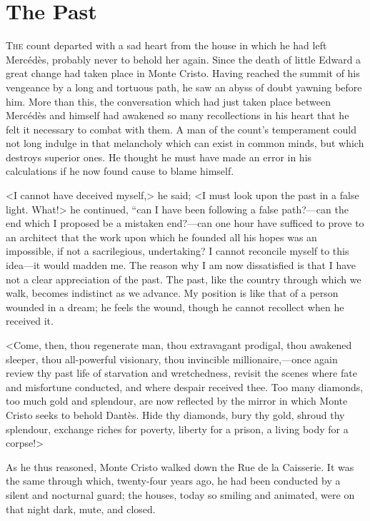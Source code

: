 \chapter{The Past} 

 \lettrine{T}{he} count departed with a sad heart from the house in which he had left Mercédès, probably never to behold her again. Since the death of little Edward a great change had taken place in Monte Cristo. Having reached the summit of his vengeance by a long and tortuous path, he saw an abyss of doubt yawning before him. More than this, the conversation which had just taken place between Mercédès and himself had awakened so many recollections in his heart that he felt it necessary to combat with them. A man of the count's temperament could not long indulge in that melancholy which can exist in common minds, but which destroys superior ones. He thought he must have made an error in his calculations if he now found cause to blame himself. 

 <I cannot have deceived myself,> he said; <I must look upon the past in a false light. What!> he continued, “can I have been following a false path?—can the end which I proposed be a mistaken end?—can one hour have sufficed to prove to an architect that the work upon which he founded all his hopes was an impossible, if not a sacrilegious, undertaking? I cannot reconcile myself to this idea—it would madden me. The reason why I am now dissatisfied is that I have not a clear appreciation of the past. The past, like the country through which we walk, becomes indistinct as we advance. My position is like that of a person wounded in a dream; he feels the wound, though he cannot recollect when he received it. 

 <Come, then, thou regenerate man, thou extravagant prodigal, thou awakened sleeper, thou all-powerful visionary, thou invincible millionaire,—once again review thy past life of starvation and wretchedness, revisit the scenes where fate and misfortune conducted, and where despair received thee. Too many diamonds, too much gold and splendour, are now reflected by the mirror in which Monte Cristo seeks to behold Dantès. Hide thy diamonds, bury thy gold, shroud thy splendour, exchange riches for poverty, liberty for a prison, a living body for a corpse!> 

 As he thus reasoned, Monte Cristo walked down the Rue de la Caisserie. It was the same through which, twenty-four years ago, he had been conducted by a silent and nocturnal guard; the houses, today so smiling and animated, were on that night dark, mute, and closed. 

